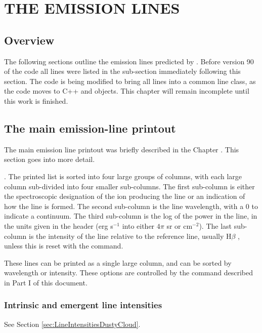 \chapter{THE EMISSION LINES}
\label{sec:EmissionLines}

\section{Overview}

The following sections outline the emission lines predicted by \Cloudy.
Before version 90 of the code all lines were listed in the sub-section
immediately following this section.  The code is being modified to bring
all lines into a common line class, as the code moves to C++ and objects.
This chapter will remain incomplete until this work is finished.


\section{The main emission-line printout }

The main emission line printout was briefly described
in the Chapter .
This section
goes into more detail.

.  The printed list is sorted into four large groups
of columns, with each large column sub-divided into four smaller sub-columns.
The first sub-column is either the spectroscopic designation of the ion
producing the line or an indication of how the line is formed.  The second
sub-column is the line wavelength, with a 0 to indicate a continuum.  The
third sub-column is the log of the power in the line, in the units given
in the header (erg s$^{-1}$ into either $4\pi$ sr or cm$^{-2}$).  The last sub-column is
the intensity of the line relative to the reference line,
usually H$\beta$ , unless
this is reset with the  command.

These lines can be printed as a single large column, and can be sorted
by wavelength or intensity.  These options are controlled by the
command described in Part I of this document.

\subsection{Intrinsic and emergent line intensities}

See Section \ref{sec:LineIntensitiesDustyCloud}.

